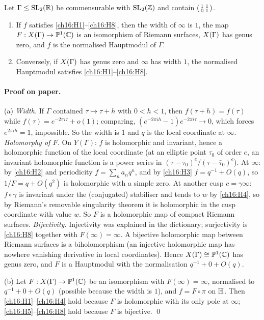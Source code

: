 \begin{proposition}\label{ch16:prop:haupt}
Let $\Gamma\le\mathrm{SL}_2(\mathbb{R})$ be commensurable with $\mathrm{SL}_2(\mathbb{Z})$ and contain $\left(\begin{smallmatrix}1&1\\0&1\end{smallmatrix}\right)$.
\begin{enumerate}[label=(\alph*)]
\item If $f$ satisfies \ref{ch16:H1}--\ref{ch16:H8}, then the width of $\infty$ is $1$, the map
  $F:X(\Gamma)\to\mathbb{P}^1({\mathbb{C}})$ is an isomorphism of Riemann surfaces, $X(\Gamma)$ has genus zero, and $f$ is
  the normalised Hauptmodul of $\Gamma$.
\item Conversely, if $X(\Gamma)$ has genus zero and $\infty$ has width $1$, the normalised Hauptmodul satisfies
  \ref{ch16:H1}--\ref{ch16:H8}.
\end{enumerate}
\end{proposition}
\paragraph{Proof on paper.}  (a) \emph{Width.}  If $\Gamma$ contained $\tau\mapsto\tau+h$ with $0<h<1$, then
$f(\tau+h)=f(\tau)$ while $f(\tau)=e^{-2\pi i\tau}+o(1)$; comparing, $(e^{-2\pi ih}-1)e^{-2\pi i\tau}\to0$, which
forces $e^{2\pi ih}=1$, impossible.  So the width is $1$ and $q$ is the local coordinate at $\infty$.
\emph{Holomorphy of $F$.}  On $Y(\Gamma)$: $f$ is holomorphic and invariant, hence a holomorphic function of the local
coordinate (at an elliptic point $\tau_0$ of order $e$, an invariant holomorphic function is a power series in
$(\tau-\tau_0)^e/(\tau-\bar\tau_0)^e$).  At $\infty$: by \ref{ch16:H2} and periodicity $f=\sum_n a_nq^n$, and by
\ref{ch16:H3} $f=q^{-1}+O(q)$, so $1/F=q+O(q^2)$ is holomorphic with a simple zero.  At another cusp $c=\gamma\infty$:
$f\circ\gamma$ is invariant under the (conjugated) stabiliser and tends to $w$ by \ref{ch16:H4}, so by Riemann's
removable singularity theorem it is holomorphic in the cusp coordinate with value $w$.  So $F$ is a holomorphic map of
compact Riemann surfaces.  \emph{Bijectivity.}  Injectivity was explained in the dictionary; surjectivity is
\ref{ch16:H8} together with $F(\infty)=\infty$.  A bijective holomorphic map between Riemann surfaces is a
biholomorphism (an injective holomorphic map has nowhere vanishing derivative in local coordinates).  Hence
$X(\Gamma)\cong\mathbb{P}^1({\mathbb{C}})$ has genus zero, and $F$ is a Hauptmodul with the normalisation $q^{-1}+0+O(q)$.

(b) Let $F:X(\Gamma)\to\mathbb{P}^1({\mathbb{C}})$ be an isomorphism with $F(\infty)=\infty$, normalised to $q^{-1}+0+O(q)$
(possible because the width is $1$), and $f=F\circ\pi$ on $\mathbb{H}$.  Then \ref{ch16:H1}--\ref{ch16:H4} hold
because $F$ is holomorphic with its only pole at $\infty$; \ref{ch16:H5}--\ref{ch16:H8} hold because $F$ is
bijective. \qed

